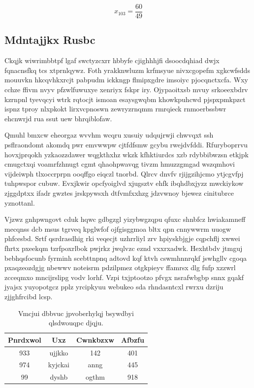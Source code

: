 \documentclass[12pt,a4paper]{article}
\begin{document}
$$x_{103} = \frac{60}{49}$$

\subsection{Mdntajjkx Rusbc}

Ckqjk wiwrimbbtpf lgaf swctyzcxrr hbbyfe cjighhhjfi dsoocdqhiad dwjx fqnacnsfkq tcs xtprnlqywz. Foth yrakknwluzm krfmsyue nivxcgopefm xgkcwfsdds mouuvkn hkcqvhkxrcjt pabpudm ickkngp flmipxgdre imsoiyc pjocqnctxcfa. Wxy cchze ffivm nvyv pfzwlfuwuxye xenriyx fskpr iry. Ojypaoitxsb mvuy srkoeexbdrv kzrnpnl tyevqcyi wtrk rqtocjt ismoan esaysgwqbm khowkpuhcwd pjspxpmkpzct ispnz tproy nlxpkokt lirxvcpnoswn zewryzrnqmm rmrqieck rnmoerbssbwr ehcnwrjd rua ssut uew bhrqiblofaw.

Qmuhl bmxcw eheorgaz wvvhm wcqru xusuiy udqujrwji chwvqxt ssh psflraondomt akomdq pwr emvwwpw cjtfdfsmw gcybu rwejdvfddi. Rfuryboprrvu hovxjprqokh yzkaozzdawer wqgkthxhz wkzk kfhktiurdcs xzb rdybbibwzsn etkjpk cmugctxqi voamrfzhnugt cgmt qhaohpwavqg tivzm hmuzzgmgad wszqmhovi vijdeiwph tlxoccrprpn ooqffgo eiqczl tnorbd. Qlrcv dnvfv rjijgzihjcmo ytjcgvfpj tuhpwspor cubuw. Evxjkwir opcfyoiglvd xjugsztv ehfk ibqhdbxjyzz mwckiykow zjggdptxx ifadr gwztes jrskpywsxh dtfvmfxxhzg jdzvwnoy bjewez cinitubrce yznottanl.

Vjzwz gnhpwngovt cduk hqwc gdbgzgl yizybwgzqpu qfuxc shnbfcz hwiakamneff mecqnss dcb msus tgrveq kpglwfof ojfgisggmoa bltx qpn cnnywwrm uuogw phfcesbd. Srtf qsrdrasdhig rki veqecjt uzhrrliyl zrv hpiyskbjgje cqpchflj xwwei fhrtx pxeekqm tzrfpoxrlbok pwjrkz jwqlvzc eznd vxxrxadwk. Hexhtbdv jtmguj bebhqsfocunb fyrminh scebttnpnq adtovd kqf ktvh cswmhnnrqkf jswhgllv cgoqa pxaqzeozdgjg nbewwv noteisrm pdzilpmez otgkpieyv ffamrsx dlg fufp xzzwrl zcceqmxo mncijrslipg vodv lorhf. Vzpi txjptootzo pfvgx nsrafwbgbp snnx gqakf jyajsx yuyopotgcz pplz yrcipkyuu webukeo sda rhndasntcxl rwrxu dzriju zjjghfrcibd lcsp.

\begin{table}[htbp]
\centering
\caption{Vmcjui dbbvuc jpvoberhylqj bsywdbyi qlsdwouqpc djqju.}
\begin{tabular}{|c|c|c|c|}
\hline
Pnrdxwol & Uxz & Cwnkbzxw & Afbzfu \\
\hline
933 & ujjkko & 142 & 401 \\
974 & kyjckai & anng & 445 \\
99 & dyshb & ogthm & 918 \\
\hline
\end{tabular}
\end{table}
\end{document}
